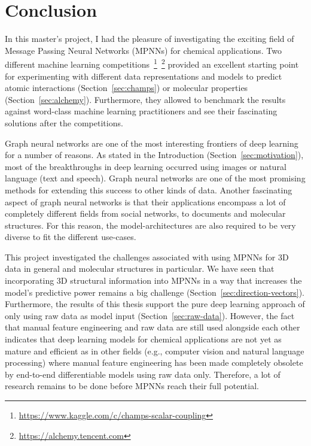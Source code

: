 \chapter{Conclusion}
\label{chapter:Conclusion}

In this master's project, I had the pleasure of investigating the exciting field of Message Passing Neural Networks (MPNNs) for chemical applications. Two different machine learning competitions~\footnote{\url{https://www.kaggle.com/c/champs-scalar-coupling}}~\footnote{\url{https://alchemy.tencent.com}} provided an excellent starting point for experimenting with different data representations and models to predict atomic interactions (Section~\ref{sec:champs}) or molecular properties (Section~\ref{sec:alchemy}). Furthermore, they allowed to benchmark the results against word-class machine learning practitioners and see their fascinating solutions after the competitions.

Graph neural networks are one of the most interesting frontiers of deep learning for a number of reasons. As stated in the Introduction (Section~\ref{sec:motivation}), most of the breakthroughs in deep learning occurred using images or natural language (text and speech). Graph neural networks are one of the most promising methods for extending this success to other kinds of data. Another fascinating aspect of graph neural networks is that their applications encompass a lot of completely different fields from social networks, to documents and molecular structures. For this reason, the model-architectures are also required to be very diverse to fit the different use-cases.

This project investigated the challenges associated with using MPNNs for 3D data in general and molecular structures in particular. We have seen that incorporating 3D structural information into MPNNs in a way that increases the model's predictive power remains a big challenge (Section~\ref{sec:direction-vectors}). Furthermore, the results of this thesis support the pure deep learning approach of only using raw data as model input (Section~\ref{sec:raw-data}). However, the fact that manual feature engineering and raw data are still used alongside each other indicates that deep learning models for chemical applications are not yet as mature and efficient as in other fields (e.g., computer vision and natural language processing) where manual feature engineering has been made completely obsolete by end-to-end differentiable models using raw data only. Therefore, a lot of research remains to be done before MPNNs reach their full potential.

